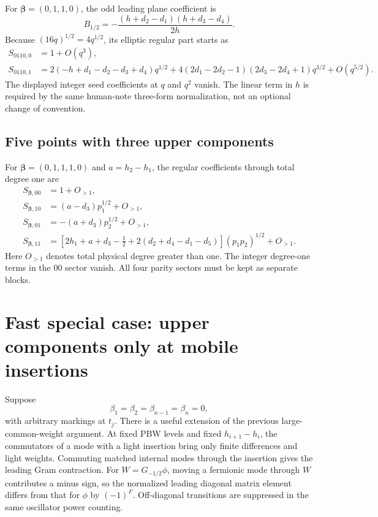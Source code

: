 \documentclass[11pt]{article}
\newcommand{\bet}{\boldsymbol\beta}
\begin{document}
For $\bet=(0,1,1,0)$, the odd leading plane coefficient is
\begin{equation}
 B_{1/2}=-\frac{(h+d_2-d_1)(h+d_3-d_4)}{2h}.
\end{equation}
Because $(16q)^{1/2}=4q^{1/2}$, its elliptic regular part starts as
\begin{align}
 S_{0110,0}&=1+O(q^3),\\
 S_{0110,1}&=
   2(-h+d_1-d_2-d_3+d_4)q^{1/2}
   +4(2d_1-2d_2-1)(2d_3-2d_4+1)q^{3/2}
   +O(q^{5/2}).
\end{align}
The displayed integer seed coefficients at $q$ and $q^2$ vanish.
The linear term in $h$ is required by the same human-note three-form
normalization, not an optional change of convention.

\subsection{Five points with three upper components}

For $\bet=(0,1,1,1,0)$ and $a=h_2-h_1$, the regular coefficients through
total degree one are
\begin{align}
 S_{\bet,00}&=1+O_{>1},\\
 S_{\bet,10}&=(a-d_3)p_1^{1/2}+O_{>1},\\
 S_{\bet,01}&=-(a+d_3)p_2^{1/2}+O_{>1},\\
 S_{\bet,11}&=
 \left[2h_1+a+d_3-\frac12+2(d_2+d_4-d_1-d_5)\right]
       (p_1p_2)^{1/2}+O_{>1}.
\end{align}
Here $O_{>1}$ denotes total physical degree greater than one.
The integer degree-one terms in the $00$ sector vanish.
All four parity sectors must be kept as separate blocks.

\section{Fast special case: upper components only at mobile insertions}

Suppose
\begin{equation}\label{eq:bottom-caps}
 \beta_1=\beta_2=\beta_{n-1}=\beta_n=0,
\end{equation}
with arbitrary markings at $t_j$.  There is a useful extension of the
previous large-common-weight argument.  At fixed PBW levels and fixed
$h_{i+1}-h_i$, the commutators of a mode with a light insertion bring
only finite differences and light weights.  Commuting matched internal
modes through the insertion gives the leading Gram contraction.  For
$W=G_{-1/2}\phi$, moving a fermionic mode through $W$ contributes a
minus sign, so the normalized leading diagonal matrix element differs
from that for $\phi$ by $(-1)^F$.  Off-diagonal transitions are suppressed
in the same oscillator power counting.
\end{document}
